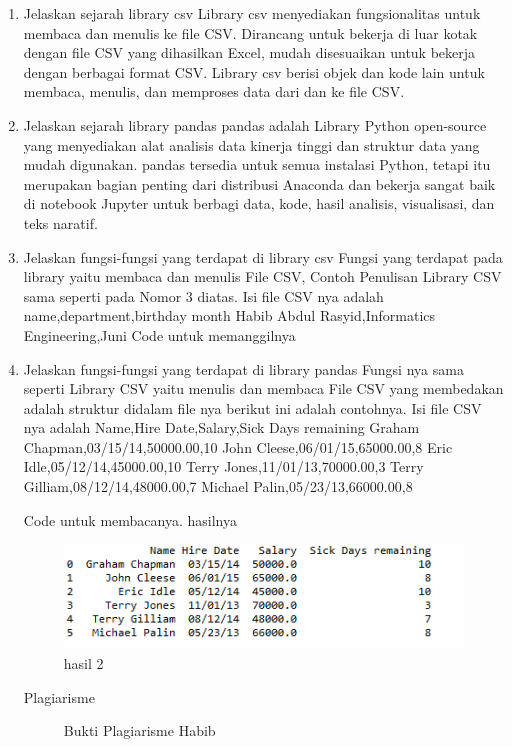 \begin {enumerate}
\item Jelaskan sejarah library csv
Library csv menyediakan fungsionalitas untuk membaca dan menulis ke file CSV. Dirancang untuk bekerja di luar kotak dengan file CSV yang dihasilkan Excel, mudah disesuaikan untuk bekerja dengan berbagai format CSV. Library csv berisi objek dan kode lain untuk membaca, menulis, dan memproses data dari dan ke file CSV.
\item Jelaskan sejarah library pandas
pandas adalah Library Python open-source yang menyediakan alat analisis data kinerja tinggi dan struktur data yang mudah digunakan. pandas tersedia untuk semua instalasi Python, tetapi itu merupakan bagian penting dari distribusi Anaconda dan bekerja sangat baik di notebook Jupyter untuk berbagi data, kode, hasil analisis, visualisasi, dan teks naratif.
\item Jelaskan fungsi-fungsi yang terdapat di library csv
Fungsi yang terdapat pada library yaitu membaca dan menulis File CSV, Contoh Penulisan Library CSV sama seperti pada Nomor 3 diatas.
Isi file CSV nya adalah
name,department,birthday month
Habib Abdul Rasyid,Informatics Engineering,Juni
Code untuk memanggilnya
%
	\item Jelaskan fungsi-fungsi yang terdapat di library pandas
Fungsi nya sama seperti Library CSV yaitu menulis dan membaca File CSV yang membedakan adalah struktur didalam file nya
berikut ini adalah contohnya.
Isi file CSV nya adalah
Name,Hire Date,Salary,Sick Days remaining
Graham Chapman,03/15/14,50000.00,10
John Cleese,06/01/15,65000.00,8
Eric Idle,05/12/14,45000.00,10
Terry Jones,11/01/13,70000.00,3
Terry Gilliam,08/12/14,48000.00,7
Michael Palin,05/23/13,66000.00,8

Code untuk membacanya.
%
hasilnya
\begin{figure}[h]
\centering
\includegraphics[scale=0.5]{figures/habib/hasil2.png}
\caption{hasil 2}
\label{fig:csv}
\end{figure}

Plagiarisme
\begin{figure}[h]
\centering
\caption{Bukti Plagiarisme Habib}
\label{fig:plagiarisme}
\end{figure}
\end{enumerate}


